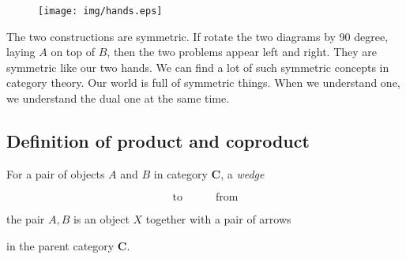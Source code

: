 \documentclass{article}
\begin{document}
\begin{center}
\end{center}

\begin{figure}[htbp]
 \centering
 \texttt{[image: img/hands.eps]}
 \captionsetup{labelformat=empty}
 \caption{}
 \label{fig:hands}
\end{figure}

The two constructions are symmetric. If rotate the two diagrams by 90 degree, laying $A$ on top of $B$, then the two problems appear left and right. They are symmetric like our two hands. We can find a lot of such symmetric concepts in category theory. Our world is full of symmetric things. When we understand one, we understand the dual one at the same time.

\subsection{Definition of product and coproduct}
 
\begin{definition}
For a pair of objects $A$ and $B$ in category $\pmb{C}$, a {\em wedge}

\[
\text{to} \quad \quad \quad \text{from}
\]

the pair $A, B$ is an object $X$ together with a pair of arrows

\begin{center}
\end{center}

in the parent category $\pmb{C}$.
\end{definition}
\end{document}
